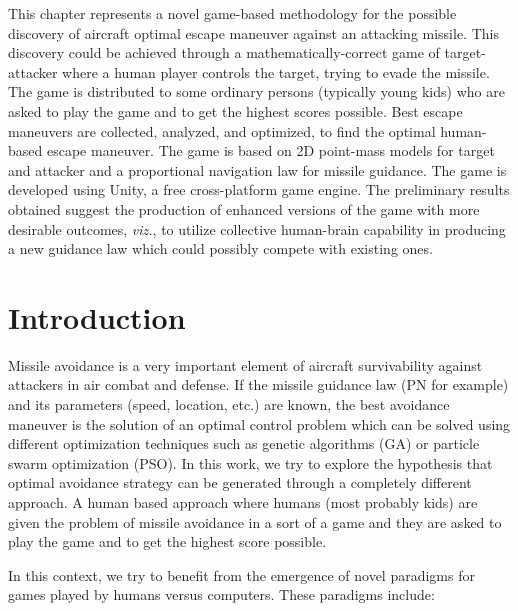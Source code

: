 \label{game}

This chapter represents a novel game-based methodology for the possible discovery of aircraft optimal escape maneuver against an attacking missile. This discovery could be achieved through a mathematically-correct game of target-attacker where a human player controls the target, trying to evade the missile.  The game is distributed to some ordinary persons (typically young kids) who are asked to play the game and to get the highest scores possible. Best escape maneuvers are collected, analyzed, and optimized, to find the optimal human-based escape maneuver. The game is based on 2D point-mass models for target and attacker and a proportional navigation law for missile guidance. The game is developed using Unity, a free cross-platform game engine. The preliminary results obtained suggest the production of enhanced versions of the game with more desirable outcomes, \textit{viz.}, to utilize collective human-brain capability in producing a new guidance law which could possibly compete with existing ones.

\section{Introduction}

Missile avoidance is a very important element of aircraft survivability against attackers in air combat and defense. If the missile guidance law (PN for example) and its parameters (speed, location, etc.) are known, the best avoidance maneuver is the solution of an optimal control problem which can be solved using different optimization techniques such as genetic algorithms (GA) or particle swarm optimization (PSO).  In this work, we try to explore the hypothesis that optimal avoidance strategy can be generated through a completely different approach. A human based approach where humans (most probably kids) are given the problem of missile avoidance in a sort of a game and they are asked to play the game and to get the highest score possible.

In this context, we try to benefit from the emergence of novel paradigms for games played by humans versus computers. These paradigms include:

